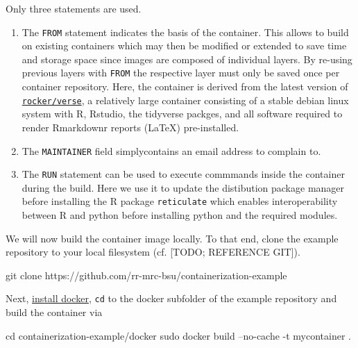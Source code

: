 \documentclass[]{book}
\newenvironment{Shaded}{\begin{snugshade}}{\end{snugshade}}
\newcommand{\FunctionTok}[1]{\textcolor[rgb]{0.00,0.00,0.00}{#1}}
\newcommand{\BuiltInTok}[1]{#1}
\newcommand{\NormalTok}[1]{#1}
\providecommand{\tightlist}{%
  \setlength{\itemsep}{0pt}\setlength{\parskip}{0pt}}
\begin{document}
Only three statements are used.

\begin{enumerate}
\def\labelenumi{\arabic{enumi}.}
\tightlist
\item
  The \texttt{FROM} statement indicates the basis of the container. This
  allows to build on existing containers which may then be modified or
  extended to save time and storage space since images are composed of
  individual layers. By re-using previous layers with \texttt{FROM} the
  respective layer must only be saved once per container repository.
  Here, the container is derived from the latest version of
  \href{https://www.rocker-project.org/}{\texttt{rocker/verse}}, a
  relatively large container consisting of a stable debian linux system
  with R, Rstudio, the tidyverse packges, and all software required to
  render Rmarkdownr reports (LaTeX) pre-installed.
\item
  The \texttt{MAINTAINER} field simplycontains an email address to
  complain to.
\item
  The \texttt{RUN} statement can be used to execute commmands inside the
  container during the build. Here we use it to update the distibution
  package manager before installing the R package \texttt{reticulate}
  which enables interoperability between R and python before installing
  python and the required modules.
\end{enumerate}

We will now build the container image locally. To that end, clone the
example repository to your local filesystem (cf. {[}TODO; REFERENCE
GIT{]}).

\begin{Shaded}
\begin{Highlighting}[]
\FunctionTok{git}\NormalTok{ clone https://github.com/rr-mrc-bsu/containerization-example}
\end{Highlighting}
\end{Shaded}

Next, \href{https://docs.docker.com/install/}{install docker},
\texttt{cd} to the docker subfolder of the example repository and build
the container via

\begin{Shaded}
\begin{Highlighting}[]
\BuiltInTok{cd}\NormalTok{ containerization-example/docker}
\FunctionTok{sudo}\NormalTok{ docker build --no-cache -t mycontainer .}
\end{Highlighting}
\end{Shaded}
\end{document}
